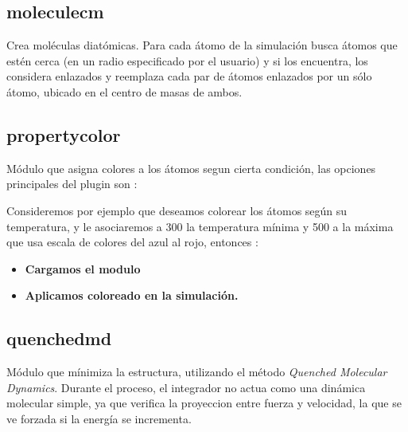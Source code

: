 \subsection{moleculecm}
Crea mol\'eculas diat\'omicas. Para cada \'atomo de la simulaci\'on busca
\'atomos que est\'en cerca (en un radio especificado por el usuario) y si los
encuentra, los considera enlazados y reemplaza cada par de \'atomos enlazados
por un s\'olo \'atomo, ubicado en el centro de masas de ambos.



\subsection{propertycolor}
M\'odulo que asigna colores a los \'atomos segun cierta condici\'on, las
opciones principales del plugin son :


Consideremos por ejemplo que deseamos colorear los \'atomos seg\'un su
temperatura, y le asociaremos a 300 la temperatura m\'inima y 500 a la m\'axima
que usa escala de colores del azul al rojo, entonces :

\begin{itemize}
 \item \textbf{Cargamos el modulo}
 \item \textbf{Aplicamos coloreado en la simulaci\'on.}
\end{itemize}

\subsection{quenchedmd}
M\'odulo que m\'inimiza la estructura, utilizando el m\'etodo \textit{Quenched
Molecular Dynamics}. Durante el proceso, el integrador no actua como una
din\'amica molecular simple, ya que verifica la proyeccion entre fuerza y
velocidad, la que se ve forzada si la energ\'ia se incrementa.

